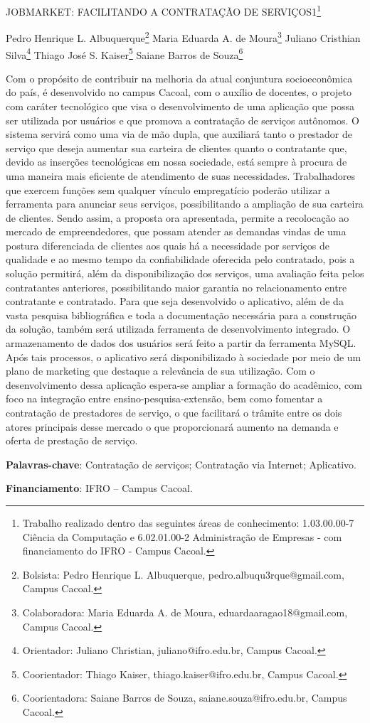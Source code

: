 \documentclass[article,12pt,onesidea,4paper,english,brazil]{abntex2}
\begin{document}
	
	
	\frenchspacing 
	
	\begin{center}
		\LARGE JOBMARKET: FACILITANDO A CONTRATAÇÃO DE SERVIÇOS1\footnote{Trabalho realizado dentro das seguintes áreas de conhecimento: 1.03.00.00-7 Ciência da
			Computação e 6.02.01.00-2 Administração de Empresas - com financiamento do IFRO -
			Campus Cacoal.}
		
		\normalsize
		Pedro Henrique L. Albuquerque\footnote{Bolsista: Pedro Henrique L. Albuquerque, pedro.albuqu3rque@gmail.com, Campus Cacoal.} 
		Maria Eduarda A. de Moura\footnote{Colaboradora: Maria Eduarda A. de Moura, eduardaaragao18@gmail.com, Campus Cacoal.} 
		Juliano Cristhian Silva\footnote{Orientador: Juliano Christian, juliano@ifro.edu.br, Campus Cacoal.}
		Thiago José S. Kaiser\footnote{Coorientador: Thiago Kaiser, thiago.kaiser@ifro.edu.br, Campus Cacoal.}
		Saiane Barros de Souza\footnote{Coorientadora: Saiane Barros de Souza, saiane.souza@ifro.edu.br, Campus Cacoal.}
		 
	\end{center}
	
	\noindent Com o propósito de contribuir na melhoria da atual conjuntura socioeconômica do
	país, é desenvolvido no campus Cacoal, com o auxílio de docentes, o projeto com
	caráter tecnológico que visa o desenvolvimento de uma aplicação que possa ser
	utilizada por usuários e que promova a contratação de serviços autônomos. O
	sistema servirá como uma via de mão dupla, que auxiliará tanto o prestador de
	serviço que deseja aumentar sua carteira de clientes quanto o contratante que,
	devido as inserções tecnológicas em nossa sociedade, está sempre à procura de
	uma maneira mais eficiente de atendimento de suas necessidades. Trabalhadores
	que exercem funções sem qualquer vínculo empregatício poderão utilizar a
	ferramenta para anunciar seus serviços, possibilitando a ampliação de sua carteira
	de clientes. Sendo assim, a proposta ora apresentada, permite a recolocação ao
	mercado de empreendedores, que possam atender as demandas vindas de uma
	postura diferenciada de clientes aos quais há a necessidade por serviços de
	qualidade e ao mesmo tempo da confiabilidade oferecida pelo contratado, pois a
	solução permitirá, além da disponibilização dos serviços, uma avaliação feita pelos
	contratantes anteriores, possibilitando maior garantia no relacionamento entre
	contratante e contratado. Para que seja desenvolvido o aplicativo, além de da vasta
	pesquisa bibliográfica e toda a documentação necessária para a construção da
	solução, também será utilizada ferramenta de desenvolvimento integrado. O
	armazenamento de dados dos usuários será feito a partir da ferramenta MySQL.
	Após tais processos, o aplicativo será disponibilizado à sociedade por meio de um
	plano de marketing que destaque a relevância de sua utilização. Com o
	desenvolvimento dessa aplicação espera-se ampliar a formação do acadêmico, com
	foco na integração entre ensino-pesquisa-extensão, bem como fomentar a
	contratação de prestadores de serviço, o que facilitará o trâmite entre os dois atores
	principais desse mercado o que proporcionará aumento na demanda e oferta de
	prestação de serviço.
	
	\vspace{\onelineskip}
	
	\noindent
	\textbf{Palavras-chave}: Contratação de serviços; Contratação via Internet; Aplicativo.
	
	\noindent
	\textbf{Financiamento}: IFRO – Campus Cacoal.
	
\end{document}
